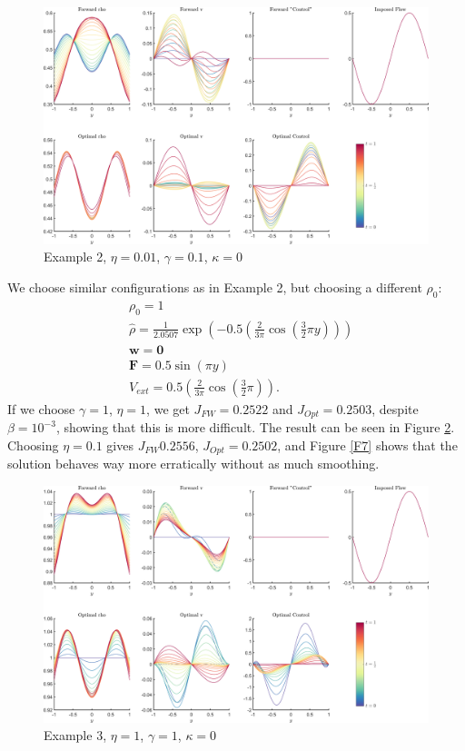 \documentclass[11pt, a4paper]{article}
\theoremstyle{definition}
\newcommand{\w}{\mathbf{w}}
\begin{document}
	\begin{figure}[h]
		\centering
		\includegraphics[scale=0.04]{Example2b.png}
		\caption{Example 2, $\eta = 0.01$, $\gamma = 0.1$, $\kappa = 0$} 
		\label{F5}
	\end{figure}

We choose similar configurations as in Example 2, but choosing a different $\rho_0$:
\begin{align*}
&\rho_0 = 1\\
&\widehat \rho = \frac{1}{2.0507} \exp\left(-0.5\left(\frac{2}{3 \pi}\cos\left(\frac{3}{2}\pi y\right)\right) \right)\\
&\w = \mathbf 0 \\
&\mathbf{F} = 0.5 \sin(\pi y)\\
&V_{ext} = 0.5 \left(\frac{2}{3 \pi}\cos\left(\frac{3}{2}\pi \right) \right).
\end{align*}
If we choose $\gamma = 1$, $\eta = 1$, we get $J_{FW} = 0.2522$ and $J_{Opt} = 0.2503$, despite $\beta = 10^{-3}$, showing that this is more difficult. The result can be seen in Figure \ref{F6}. 
Choosing $\eta = 0.1$ gives $J_{FW} 0.2556$, $J_{Opt} = 0.2502$, and Figure \ref{F7} shows that the solution behaves way more erratically without as much smoothing.
\begin{figure}[h]
	\centering
	\includegraphics[scale=0.04]{Example3b.png}
	\caption{Example 3, $\eta = 1$, $\gamma = 1$, $\kappa = 0$} 
	\label{F6}
\end{figure}
\end{document}
